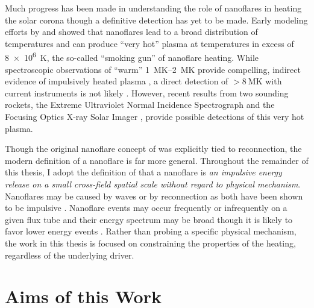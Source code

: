 Much progress has been made in understanding the role of nanoflares in heating the solar corona though a definitive detection has yet to be made. Early modeling efforts by \citet{cargill_implications_1994} and \citet{cargill_nanoflare_2004} showed that nanoflares lead to a broad distribution of temperatures and can produce ``very hot'' plasma at temperatures in excess of \SI{8e6}{\kelvin}, the so-called ``smoking gun'' of nanoflare heating. While spectroscopic observations of ``warm'' \SIrange{1}{2}{\mega\kelvin} provide compelling, indirect evidence of impulsively heated plasma \citep[e.g.]{warren_constraints_2011,warren_systematic_2012,viall_evidence_2012}, a direct detection of $>\SI{8}{\mega\kelvin}$ with current instruments is not likely \citet{winebarger_defining_2012}. However, recent results from two sounding rockets, the Extreme Ultraviolet Normal Incidence Spectrograph \citep[EUNIS,][]{brosius_pervasive_2014} and the Focusing Optics X-ray Solar Imager \citep[FOXSI,][]{ishikawa_detection_2017}, provide possible detections of this very hot plasma.

Though the original nanoflare concept of \citet{parker_nanoflares_1988} was explicitly tied to reconnection, the modern definition of a nanoflare is far more general. Throughout the remainder of this thesis, I adopt the definition of \citet{klimchuk_key_2015} that a nanoflare is \textit{an impulsive energy release on a small cross-field spatial scale without regard to physical mechanism}. Nanoflares may be caused by waves or by reconnection as both have been shown to be impulsive \citep{klimchuk_solving_2006,klimchuk_key_2015}. Nanoflare events may occur frequently or infrequently on a given flux tube and their energy spectrum may be broad though it is likely to favor lower energy events \citep{hudson_solar_1991}. Rather than probing a specific physical mechanism, the work in this thesis is focused on constraining the properties of the heating, regardless of the underlying driver.

\section{Aims of this Work}\label{sec:aims}

